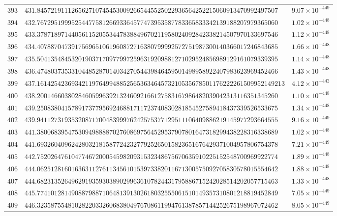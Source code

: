 \documentclass[12pt,reqno]{amsart}
\theoremstyle{remark}
\begin{document}
\begin{longtable}{clc}
$393$ & $431.8457219111265627107454530092665445525022936564252215060913470992497507$ & $9.07\times 10^{-449}$ \\
$394$ & $432.7672951999525447758126693364577473953587783365833342139188207979365060$ & $1.02\times 10^{-448}$ \\
$395$ & $433.3787189714405611520553447838849670211958024092842338214507970133697546$ & $1.12\times 10^{-448}$ \\
$396$ & $434.4078870473917569651061960872716380799992572751987300140366017246843685$ & $1.66\times 10^{-448}$ \\
$397$ & $435.5041354845320190371709779972596319209881271029524856989129161079339395$ & $1.14\times 10^{-448}$ \\
$398$ & $436.4748037353310448528701403427054439846459501498958922407983623969452466$ & $1.43\times 10^{-448}$ \\
$399$ & $437.161425423693421197649948852565363464573210535678501176222261509952149213$ & $4.12\times 10^{-442}$ \\
$400$ & $438.2001466038028460599639213246092166127583167986482039042313116351345260$ & $1.10\times 10^{-448}$ \\
$401$ & $439.2508380415789173779569246881711723740830281854527589418437339526533675$ & $1.34\times 10^{-448}$ \\
$402$ & $439.9411273193532087170048399976242575377129511106409886219145977293664555$ & $9.16\times 10^{-449}$ \\
$403$ & $441.3800683954753094988887027608697564529537907801647318299438228316338689$ & $1.02\times 10^{-448}$ \\
$404$ & $441.6932604096242803218158772423277925265015823651676429371004957806754378$ & $7.21\times 10^{-449}$ \\
$405$ & $442.7520264761047746720005459820931532348675670635910225152548700969922774$ & $1.89\times 10^{-448}$ \\
$406$ & $444.0625128160163631127611345610153973382011671300575092705830578015554642$ & $1.88\times 10^{-448}$ \\
$407$ & $444.6823135264962919359303890299636107824431795886715242028514202057715463$ & $1.33\times 10^{-448}$ \\
$408$ & $445.7741012814908879887106481391302618032555061510149357310801218819452849$ & $7.05\times 10^{-449}$ \\
$409$ & $446.3235875548102822033260683804976708611994761387857144252675198967072462$ & $8.05\times 10^{-449}$ \\

\end{longtable}
\end{document}
